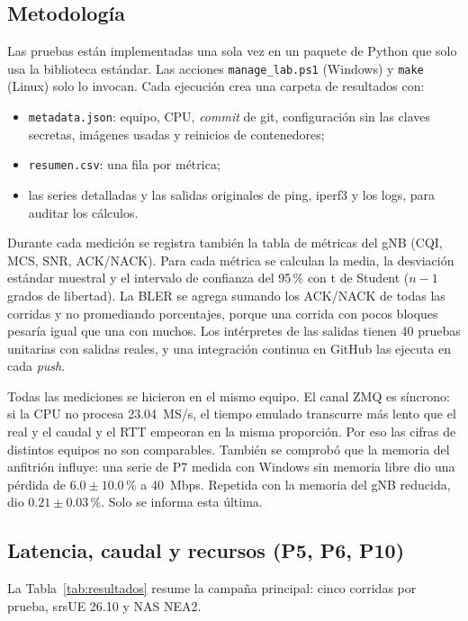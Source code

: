 \documentclass[conference]{IEEEtran}
\begin{document}
\subsection{Metodología}
Las pruebas están implementadas una sola vez en un paquete de Python que solo usa la biblioteca estándar. Las acciones \texttt{manage\_lab.ps1} (Windows) y \texttt{make} (Linux) solo lo invocan. Cada ejecución crea una carpeta de resultados con:
\begin{itemize}
  \item \texttt{metadata.json}: equipo, CPU, \textit{commit} de git, configuración sin las claves secretas, imágenes usadas y reinicios de contenedores;
  \item \texttt{resumen.csv}: una fila por métrica;
  \item las series detalladas y las salidas originales de ping, iperf3 y los logs, para auditar los cálculos.
\end{itemize}
Durante cada medición se registra también la tabla de métricas del gNB (CQI, MCS, SNR, ACK/NACK). Para cada métrica se calculan la media, la desviación estándar muestral y el intervalo de confianza del 95\,\% con t de Student ($n-1$ grados de libertad). La BLER se agrega sumando los ACK/NACK de todas las corridas y no promediando porcentajes, porque una corrida con pocos bloques pesaría igual que una con muchos. Los intérpretes de las salidas tienen 40 pruebas unitarias con salidas reales, y una integración continua en GitHub las ejecuta en cada \textit{push}.

Todas las mediciones se hicieron en el mismo equipo. El canal ZMQ es síncrono: si la CPU no procesa 23.04~MS/s, el tiempo emulado transcurre más lento que el real y el caudal y el RTT empeoran en la misma proporción. Por eso las cifras de distintos equipos no son comparables. También se comprobó que la memoria del anfitrión influye: una serie de P7 medida con Windows sin memoria libre dio una pérdida de $6.0\pm10.0$\,\% a 40~Mbps. Repetida con la memoria del gNB reducida, dio $0.21\pm0.03$\,\%. Solo se informa esta última.

\subsection{Latencia, caudal y recursos (P5, P6, P10)}
La Tabla~\ref{tab:resultados} resume la campaña principal: cinco corridas por prueba, srsUE 26.10 y NAS NEA2.
\end{document}
